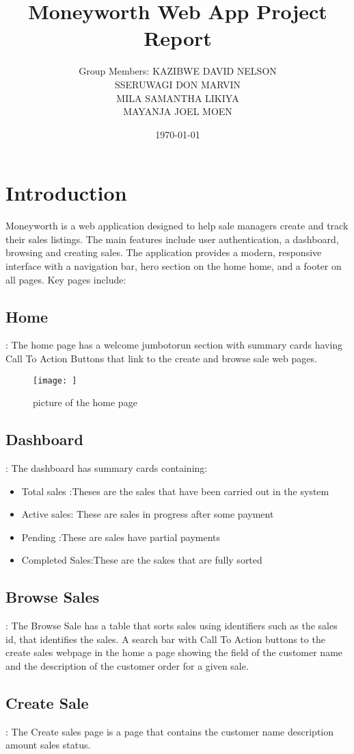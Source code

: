 \documentclass[12pt]{article}
\title{Moneyworth Web App Project Report}
\author{Group Members: KAZIBWE DAVID NELSON\\SSERUWAGI DON MARVIN\\ MILA SAMANTHA LIKIYA\\ MAYANJA JOEL MOEN}
\date{\today}
\begin{document}
\maketitle

\section{Introduction}
Moneyworth is a web application designed to help sale managers 
create and track their sales listings.
The main features include user authentication, a dashboard,
browsing and creating sales. The application provides a modern, responsive interface with a navigation bar, 
hero section on the home home, and a footer on all pages.
Key pages include:
 \subsection{Home}:
 The home page has a welcome jumbotorun section with summary cards having Call To Action Buttons that link to the create and browse sale web pages.
 \begin{figure}[h]
     \centering
     \texttt{[image: ]}
     \caption{picture of the home page}
     \label{fig:enter-label}
 \end{figure}
\subsection{Dashboard }: The dashboard has summary cards containing: 
 \begin{itemize}
     \item Total sales :Theses are the sales that have been carried out in the system
     \item Active sales: These are sales in progress after some payment 
     \item Pending :These are sales have partial payments
     \item Completed Sales:These are the sakes that are fully sorted
 \end{itemize}
 \subsection{Browse Sales}: The Browse Sale has a table that sorts sales using identifiers such as the sales id, that identifies the sales.
 A search bar  with Call To Action buttons to the create sales webpage in the home a page  showing the field of the customer name and the description of the customer order for a given sale.
 \subsection{Create Sale}:
The Create sales page is a page that contains the customer name description amount sales status.
\end{document}
